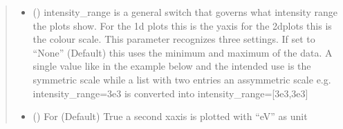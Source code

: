 \documentclass[letterpaper,10pt,english]{sphinxmanual}
\begin{document}
\begin{fulllineitems}
\begin{quote}
\begin{description}
\begin{itemize}
\item {} 
 (\sphinxstyleliteralemphasis{\sphinxupquote{, }}\sphinxstyleliteralemphasis{\sphinxupquote{ {[}}}\sphinxstyleliteralemphasis{\sphinxupquote{{]}}}) \textendash{} intensity\_range is a general switch that governs what intensity range the plots show.
For the 1d plots this is the y\sphinxhyphen{}axis for the 2d\sphinxhyphen{}plots this is the colour scale.
This parameter recognizes three settings. If set to “None” (Default) this uses the minimum and
maximum of the data. A single value like in the example below and the intended use is the symmetric
scale while a list with two entries an assymmetric scale e.g.
intensity\_range=3e\sphinxhyphen{}3 is converted into intensity\_range={[}\sphinxhyphen{}3e\sphinxhyphen{}3,3e\sphinxhyphen{}3{]}

\item {} 
 (\sphinxstyleliteralemphasis{\sphinxupquote{, }}) \textendash{} For (Default) True a second x\sphinxhyphen{}axis is plotted  with “eV” as unit


\end{itemize}
\end{description}
\end{quote}
\end{fulllineitems}
\end{document}
